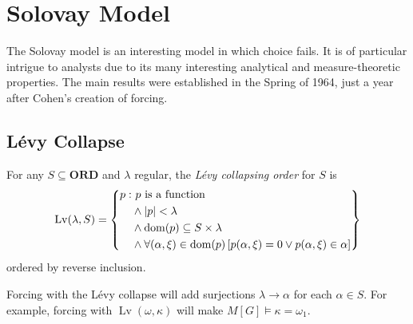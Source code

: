 \chapter{Solovay Model}

The Solovay model is an interesting model in which choice fails.
It is of particular intrigue to analysts due to its many interesting analytical and measure-theoretic properties.
The main results were established in the Spring of 1964, just a year after Cohen's creation of forcing.

\section{Lévy Collapse}


\newcommand*{\Lv}{\operatorname{Lv}}
\begin{definition}
    For any \(S\subseteq \mathbf{ORD}\) and \(\lambda\) regular, the \emph{Lévy collapsing order} for \(S\) is
    \[
        \Lv(\lambda, S) = \set{
            \begin{split}
                p: &\ p\text{ is a function} \\
                   &\land \abs{p} < \lambda \\
                   &\land \dom(p) \subseteq S\times\lambda \\
                   &\land \forall (\alpha,\xi)\in\dom(p)\sq{p(\alpha,\xi) = 0 \lor p(\alpha,\xi)\in \alpha}
            \end{split}
        }
    \]
    ordered by reverse inclusion.
\end{definition}
\begin{remark}
    Forcing with the Lévy collapse will add surjections \(\lambda\to\alpha\) for each \(\alpha\in S\).
    For example, forcing with \(\Lv(\omega,\kappa)\) will make \(M[G]\models \kappa = \omega_1\).
\end{remark}


